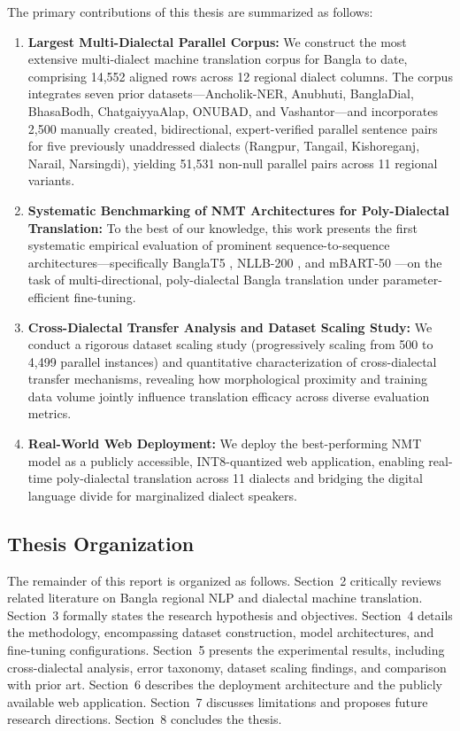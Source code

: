 \documentclass[12pt,a4paper]{article}
\begin{document}
The primary contributions of this thesis are summarized as follows:
\begin{enumerate}[leftmargin=*]
    \item \textbf{Largest Multi-Dialectal Parallel Corpus:} We construct the most extensive multi-dialect machine translation corpus for Bangla to date, comprising 14,552 aligned rows across 12 regional dialect columns. The corpus integrates seven prior datasets---Ancholik-NER, Anubhuti, BanglaDial, BhasaBodh, ChatgaiyyaAlap, ONUBAD, and Vashantor---and incorporates 2,500 manually created, bidirectional, expert-verified parallel sentence pairs for five previously unaddressed dialects (Rangpur, Tangail, Kishoreganj, Narail, Narsingdi), yielding 51,531 non-null parallel pairs across 11 regional variants.
    \item \textbf{Systematic Benchmarking of NMT Architectures for Poly-Dialectal Translation:} To the best of our knowledge, this work presents the first systematic empirical evaluation of prominent sequence-to-sequence architectures---specifically BanglaT5 \cite{bhattacharjee-etal-2023-banglanlg}, NLLB-200 \cite{nllb2022}, and mBART-50 \cite{tang2020multilingual}---on the task of multi-directional, poly-dialectal Bangla translation under parameter-efficient fine-tuning.
    \item \textbf{Cross-Dialectal Transfer Analysis and Dataset Scaling Study:} We conduct a rigorous dataset scaling study (progressively scaling from 500 to 4,499 parallel instances) and quantitative characterization of cross-dialectal transfer mechanisms, revealing how morphological proximity and training data volume jointly influence translation efficacy across diverse evaluation metrics.
    \item \textbf{Real-World Web Deployment:} We deploy the best-performing NMT model as a publicly accessible, INT8-quantized web application, enabling real-time poly-dialectal translation across 11 dialects and bridging the digital language divide for marginalized dialect speakers.
\end{enumerate}

\subsection{Thesis Organization}
The remainder of this report is organized as follows. Section~2 critically reviews related literature on Bangla regional NLP and dialectal machine translation. Section~3 formally states the research hypothesis and objectives. Section~4 details the methodology, encompassing dataset construction, model architectures, and fine-tuning configurations. Section~5 presents the experimental results, including cross-dialectal analysis, error taxonomy, dataset scaling findings, and comparison with prior art. Section~6 describes the deployment architecture and the publicly available web application. Section~7 discusses limitations and proposes future research directions. Section~8 concludes the thesis.
\end{document}
